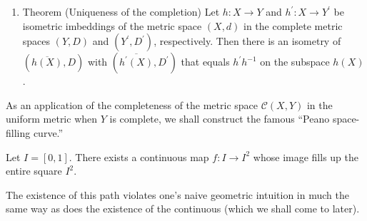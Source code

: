 \begin{enumerate}[itemsep=0.4em, parsep=0pt, topsep=0pt, partopsep=0pt, leftmargin=*, label=\arabic*., ref=\arabic*]
 \begin{enumerate}[itemsep=0.2em, parsep=0pt, topsep=0pt, partopsep=0pt, leftmargin=*, label=(\alph*), align=left]
 \item Show that \(\sim\) is an equivalence relation, and show that \(D\) is a well-defined metric.
 \item Define \(h : X \rightarrow Y\) by letting \(h(x)\) be the equivalence class of the constant sequence \(({x,x,\ldots })\) : \[ h(x) = [ ({x,x,\ldots }) ] . \] Show that \(h\) is an isometric imbedding.
 \item Show that \(h(X)\) is dense in \(Y\) ; indeed, given \(\mathbf{x} = ({x_{1},x_{2},\ldots }) \in \widetilde{X}\), show the sequence \(h(x_{n})\) of points of \(Y\) converges to the point \([ \mathbf{x}]\) of \(Y\).
 \item Show that if \(A\) is a dense subset of a metric space \(({Z,\rho })\), and if every Cauchy sequence in \(A\) converges in \(Z\), then \(Z\) is complete.
 \item Show that \((Y, D)\) is complete.
 \end{enumerate}
\item Theorem (Uniqueness of the completion) Let \(h : X \rightarrow Y\) and \(h^{\prime } : X \rightarrow {Y}^{\prime }\) be isometric imbeddings of the metric space \((X, d)\) in the complete metric spaces \((Y, D)\) and \(({Y^{\prime },D^{\prime }})\), respectively. Then there is an isometry of \(({\overline{h(X)},D})\) with \(({\overline{h^{\prime }(X) },D^{\prime }})\) that equals \(h^{\prime }h^{-1}\) on the subspace \(h(X)\).
\end{enumerate}

As an application of the completeness of the metric space \(\mathcal{C}({X,Y})\) in the uniform metric when \(Y\) is complete, we shall construct the famous ``Peano space-filling curve.''

\begin{theorem}
\label{thm:\thetheorem}
Let \(I = [ {0,1}]\). There exists a continuous map \(f : I \rightarrow {I}^{2}\) whose image fills up the entire square \(I^{2}\).
\end{theorem}

The existence of this path violates one's naive geometric intuition in much the same way as does the existence of the continuous  (which we shall come to later).

